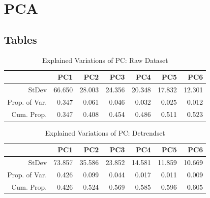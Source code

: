 \documentclass[11pt]{article}
\begin{document}
\appendix
\section{PCA}
\subsection{Tables}
\begin{table}[ht]
	\centering
	\begin{tabular}{rrrrrrr}
		\hline
		& PC1 & PC2 & PC3 & PC4 & PC5 & PC6 \\ 
		\hline
		StDev & 66.650 & 28.003 & 24.356 & 20.348 & 17.832 & 12.301 \\ 
		Prop. of Var. & 0.347 & 0.061 & 0.046 & 0.032 & 0.025 & 0.012 \\ 
		Cum. Prop.& 0.347 & 0.408 & 0.454 & 0.486 & 0.511 & 0.523 \\ 
		\hline
	\end{tabular}
	\caption{Explained Variations of PC: Raw Dataset}\label{table:rawdataprop}
\end{table}
\begin{table}[ht]
	\centering
	\begin{tabular}{rrrrrrr}
		\hline
		& PC1 & PC2 & PC3 & PC4 & PC5 & PC6 \\ 
		\hline
		StDev & 73.857 & 35.586 & 23.852 & 14.581 & 11.859 & 10.669 \\ 
		Prop. of Var. & 0.426 & 0.099 & 0.044 & 0.017 & 0.011 & 0.009 \\ 
		Cum. Prop. & 0.426 & 0.524 & 0.569 & 0.585 & 0.596 & 0.605 \\ 
		\hline
	\end{tabular}
	\caption{Explained Variations of PC: Detrendset}\label{table:detrendprop}
\end{table}
\pagebreak
\end{document}

